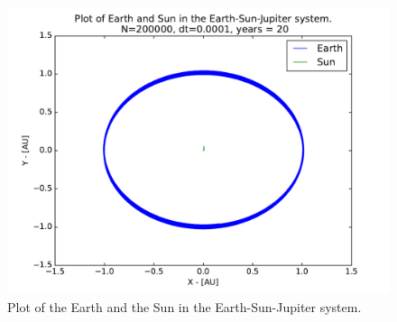 \documentclass[12pt]{article}
\begin{document}
\begin{figure}[hbtp]
\centering
\includegraphics[width=\linewidth]{Plots/ESJ_EarthandSun.pdf}
\caption{Plot of the Earth and the Sun in the Earth-Sun-Jupiter system.}
\end{figure}
\end{document}
